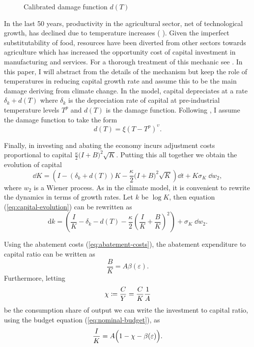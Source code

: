 \documentclass[../../main.tex]{subfiles}
\begin{document}
\begin{wrapfigure}{r}{0.5\textwidth}
    \centering
    
    \caption{Calibrated damage function $d(T)$}
    \label{fig:damage}
\end{wrapfigure}In the last 50 years, productivity in the agricultural sector, net of technological growth, has declined due to temperature increases (\citeauthor{dell_temperature_2009} \citeyear{dell_temperature_2009}). Given the imperfect substitutability of food, resources have been diverted from other sectors towards agriculture which has increased the opportunity cost of capital investment in manufacturing and services. For a thorough treatment of this mechanic see \cite{dietz_growth_2019}. In this paper, I will abstract from the details of the mechanism but keep the role of temperatures in reducing capital growth rate and assume this to be the main damage deriving from climate change. In the model, capital depreciates at a rate $\delta_k +  d(T) $ where $\delta_k$ is the depreciation rate of capital at pre-industrial temperature levels $T^p$ and $d(T)$ is the damage function. Following \cite{weitzman_ghg_2012}, I assume the damage function to take the form \begin{equation}
    d(T) = \xi (T - T^p)^{\upsilon}.
\end{equation} 

Finally, in investing and abating the economy incurs adjustment costs proportional to capital $\frac{\kappa}{2} \big(I + B \big)^2 \sqrt{K}$. Putting this all together we obtain the evolution of capital \begin{equation} \label{eq:capital-evolution}
    \dd{K} = \left( I - (\delta_k + d(T)) K - \frac{\kappa}{2} \Big(I + B\Big)^2 \sqrt{K} \right) \dd{t} + K \sigma_K \; \dd{w_2},
\end{equation} where $w_2$ is a Wiener process. As in the climate model, it is convenient to rewrite the dynamics in terms of growth rates. Let $k$ be $\log K$, then equation (\ref{eq:capital-evolution}) can be rewritten as \begin{equation} \label{eq:capital-evolution:log:level}
    \text{d}k = \left( \frac{I}{K} - \delta_k - d(T) - \frac{\kappa}{2} \left(\frac{I}{K} + \frac{B}{K}\right)^2 \right) + \sigma_K \; \dd{w_2}.
\end{equation}

Using the abatement costs (\ref{eq:abatement-costs}), the abatement expenditure to capital ratio can be written as \begin{equation}
    \frac{B}{K} = A \beta(\varepsilon).
\end{equation} Furthermore, letting \begin{equation}
    \chi \coloneqq \frac{C}{Y} = \frac{C}{K} \frac{1}{A}
\end{equation} be the consumption share of output we can write the investment to capital ratio, using the budget equation (\ref{eq:nominal-budget}), as \begin{equation}
    \frac{I}{K} = A \Big(1 - \chi - \beta(\varepsilon)\Big).
\end{equation}
\end{document}

